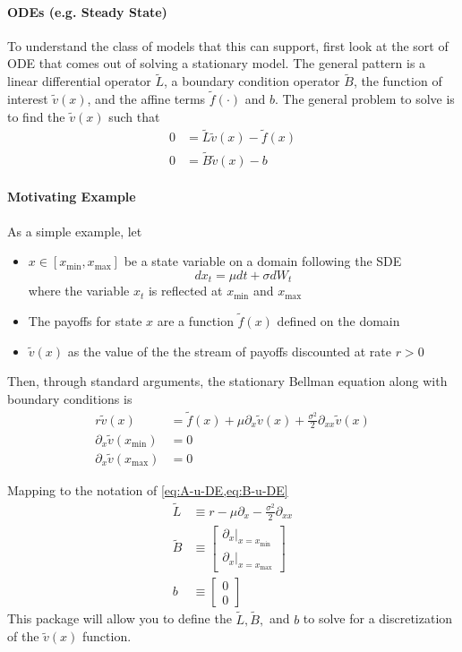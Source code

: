 \documentclass[11pt]{article}
\newcommand{\D}[1][]{\ensuremath{\partial_{#1}}}
\theoremstyle{definition}
\begin{document}
\paragraph{ODEs (e.g. Steady State)}
To understand the class of models that this can support, first look at the sort of ODE that comes out of solving a stationary model.  The general pattern is a linear differential operator $\tilde{L}$, a boundary condition operator $\tilde{B}$, the function of interest $\tilde{v}(x)$, and the affine terms $\tilde{f}(\cdot)$ and $b$. The general problem to solve is to find the $\tilde{v}(x)$ such that
\begin{align}
	0 &= \tilde{L} \tilde{v}(x) - \tilde{f}(x)\label{eq:A-u-DE}\\
	0 &= \tilde{B} \tilde{v}(x) - b\label{eq:B-u-DE}
\end{align}

\paragraph{Motivating Example}
As a simple example, let
\begin{itemize}
	\item $x \in [x_{\min},x_{\max}]$ be a state variable on a domain following the SDE
	\begin{equation} 
		d x_t = \mu d t + \sigma d W_t
	\end{equation}
	where the variable $x_t$ is reflected at $x_{\min}$ and $x_{\max}$
	\item The payoffs for state $x$ are a function $\tilde{f}(x)$ defined on the domain 
	\item $\tilde{v}(x)$ as the value of the the stream of payoffs discounted at rate $r > 0$
\end{itemize}
Then, through standard arguments, the stationary Bellman equation along with boundary conditions is
\begin{align}
	r \tilde{v}(x) &= \tilde{f}(x) + \mu \D[x] \tilde{v}(x) + \frac{\sigma^2}{2} \D[xx]\tilde{v}(x)\\
	\D[x]\tilde{v}(x_{\min}) &= 0\\
	\D[x] \tilde{v}(x_{\max}) &= 0
\end{align}

\noindent Mapping to the notation of \cref{eq:A-u-DE,eq:B-u-DE}
\begin{align}
	\tilde{L} &\equiv r - \mu \D[x] - \frac{\sigma^2}{2}\D[xx]\\
	\tilde{B} &\equiv \begin{bmatrix}
	\partial_x\vert_{x = x_{\min}}\\
	\partial_x\vert_{x = x_{\max}}
\end{bmatrix}\\
b &\equiv \begin{bmatrix} 0\\ 0 \end{bmatrix}
\end{align}
This package will allow you to define the $\tilde{L},\tilde{B},$ and $b$ to solve for a discretization of the $\tilde{v}(x)$ function.
\end{document}
